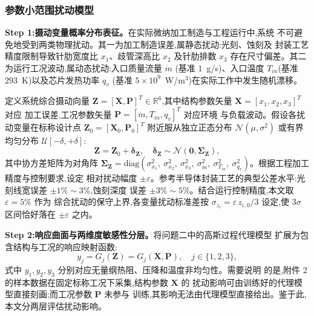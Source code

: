 \subsubsection{参数小范围扰动模型}

\textbf{Step 1:摄动变量概率分布表征。}在实际微纳加工制造与工程运行中,系统
不可避免地受到两类物理扰动。其一为加工制造误差,属静态扰动:光刻、蚀刻及
封装工艺精度限制导致针肋宽度比 $x_1$、歧管深高比 $x_2$ 及针肋排数 $x_3$
存在尺寸偏差。其二为运行工况波动,属动态扰动:入口质量流量 $\dot{m}$
(基准 $1$~g/s)、入口温度 $T_{in}$(基准 $293$~K)以及芯片发热功率 $q_v$
(基准 $5\times10^9$~W/m$^3$)在实际工作中发生随机漂移。

定义系统综合摄动向量 $\mathbf{Z} = [\mathbf{X}, \mathbf{P}]^T \in
  \mathbb{R}^6$,其中结构参数矢量 $\mathbf{X} = [x_1, x_2, x_3]^T$ 对应
加工误差,工况参数矢量 $\mathbf{P} = [\dot{m}, T_{in}, q_v]^T$ 对应环境
与负载波动。假设各扰动变量在标称设计点
$\mathbf{Z}_0 = [\mathbf{X}_0, \mathbf{P}_0]^T$ 附近服从独立正态分布
$\mathcal{N}(\mu, \sigma^2)$ 或有界均匀分布 $\mathcal{U}[-\delta,
    +\delta]$:
\begin{equation}
  \mathbf{Z} = \mathbf{Z}_0 + \boldsymbol{\delta}_{\mathbf{Z}}, \quad
  \boldsymbol{\delta}_{\mathbf{Z}} \sim \mathcal{N}\left(\mathbf{0},
  \boldsymbol{\Sigma}_{\mathbf{Z}}\right),
  \label{eq:perturb}
\end{equation}
其中协方差矩阵为对角阵
$\boldsymbol{\Sigma}_{\mathbf{Z}} = \text{diag}(\sigma_{x_1}^2,\
  \sigma_{x_2}^2,\ \sigma_{x_3}^2,\ \sigma_{\dot{m}}^2,\
  \sigma_{T_{in}}^2,\ \sigma_{q_v}^2)$。根据工程加工精度与控制要求,设定
相对扰动幅度 $\pm \varepsilon$。参考半导体封装工艺的典型公差水平:光刻线宽误差 $\pm 1\%\sim3\%$,蚀刻深度
误差 $\pm 3\%\sim5\%$。结合运行控制精度,本文取 $\varepsilon = 5\%$ 作为
综合扰动的保守上界,各变量扰动标准差按
$\sigma_{z_i} = \varepsilon\,z_{i,0}/3$ 设定,使 $3\sigma$ 区间恰好落在
$\pm\varepsilon$ 之内。

\textbf{Step 2:响应曲面与两维度敏感性分层。}将问题二中的高斯过程代理模型
扩展为包含结构与工况的响应映射函数:
\begin{equation}
  y_j = G_j(\mathbf{Z}) = G_j(\mathbf{X}, \mathbf{P}), \quad
  j \in \{1, 2, 3\},
  \label{eq:gpr-extended}
\end{equation}
式中 $y_1, y_2, y_3$ 分别对应无量纲热阻、压降和温度非均匀性。需要说明
的是,附件 2 的样本数据在固定标称工况下采集,结构参数 $\mathbf{X}$ 的
扰动影响可由训练好的代理模型直接刻画;而工况参数 $\mathbf{P}$ 未参与
训练,其影响无法由代理模型直接给出。鉴于此,本文分两层评估扰动影响。

